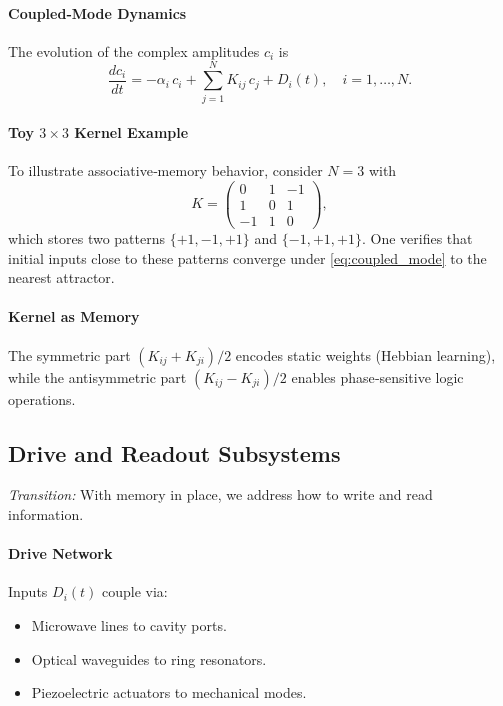 \paragraph{Coupled‐Mode Dynamics}
The evolution of the complex amplitudes \(c_i\) is
\begin{equation}\label{eq:coupled_mode}
\frac{d c_i}{dt} = -\alpha_i\,c_i + \sum_{j=1}^N K_{ij}\,c_j + D_i(t),
\quad i=1,\dots,N.
\end{equation}

\paragraph{Toy \(3\times3\) Kernel Example}
To illustrate associative‐memory behavior, consider \(N=3\) with
\[
K = \begin{pmatrix}
0 & 1 & -1\\
1 & 0 & 1\\
-1& 1 & 0
\end{pmatrix},
\]
which stores two patterns \(\{+1,-1,+1\}\) and \(\{-1,+1,+1\}\).  One verifies that initial inputs close to these patterns converge under \eqref{eq:coupled_mode} to the nearest attractor.

\paragraph{Kernel as Memory}
The symmetric part \((K_{ij}+K_{ji})/2\) encodes static weights (Hebbian learning), while the antisymmetric part \((K_{ij}-K_{ji})/2\) enables phase‐sensitive logic operations.

\subsection{Drive and Readout Subsystems}
\emph{Transition:} With memory in place, we address how to write and read information.

\paragraph{Drive Network}  
Inputs \(D_i(t)\) couple via:
\begin{itemize}
  \item Microwave lines to cavity ports.
  \item Optical waveguides to ring resonators.
  \item Piezoelectric actuators to mechanical modes.
\end{itemize}

